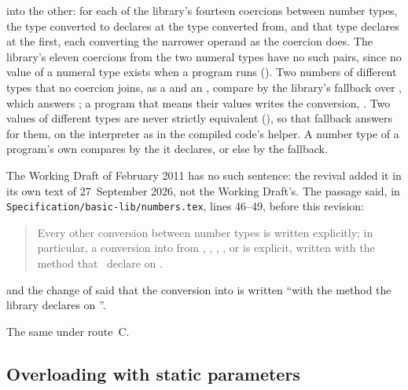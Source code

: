 \begin{description}
into the other: for each of the library's fourteen coercions between number
types, the type converted to declares \EXP{=} at the type converted from, and
that type declares \EXP{=} at the first, each converting the narrower operand as
the coercion does.
The library's eleven coercions from the two numeral types have no such pairs,
since no value of a numeral type exists when a program runs
().
Two numbers of different types that no coercion joins, as a 
and an , compare by the library's fallback \EXP{=} over
, which answers ; a program that means their values
writes the conversion, .
Two values of different types are never strictly equivalent
(), so that fallback answers  for them, on the
interpreter as in the compiled code's helper.
A number type of a program's own compares by the \EXP{=} it declares, or else by
the fallback.
\item[Original text] The Working Draft of February 2011 has no such sentence:
the revival added it in its own text of 27~September 2026, not the Working
Draft's.
The passage said, in \nolinkurl{Specification/basic-lib/numbers.tex}, lines
46--49, before this revision:
\begin{quote}
Every other conversion between number types is written explicitly;
in particular, a conversion into  from
, , , , or 
is explicit, written  with the method that \library\ declare on .
\end{quote}
and the change of  said that the conversion into
 is written ``with the method the library declares on
''.
\item[Route C] The same under route~C.
\end{description}

\subsection{Overloading with static parameters}

